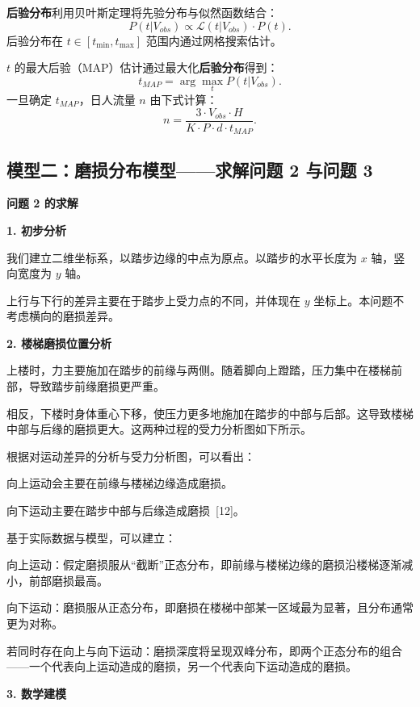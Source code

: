 \documentclass[11pt,a4paper]{ctexart}
\newcommand{\runin}[1]{\par\noindent\textbf{#1}\par\nobreak}
\begin{document}
\textbf{后验分布}利用贝叶斯定理将先验分布与似然函数结合：
\begin{equation}
P(t|V_{obs})\propto\mathcal{L}(t|V_{obs})\cdot P(t). \tag{11}
\end{equation}
后验分布在 $t\in[t_{\min},t_{\max}]$ 范围内通过网格搜索估计。

$t$ 的最大后验（MAP）估计通过最大化\textbf{后验分布}得到：
\begin{equation}
t_{MAP}=\arg\max_{t}P(t|V_{obs}). \tag{12}
\end{equation}
一旦确定 $t_{MAP}$，日人流量 $n$ 由下式计算：
\begin{equation}
n=\frac{3\cdot V_{obs}\cdot H}{K\cdot P\cdot d\cdot t_{MAP}}. \tag{13}
\end{equation}

\subsection{模型二：磨损分布模型——求解问题 2 与问题 3}

\runin{问题 2 的求解}

\runin{1. 初步分析}

我们建立二维坐标系，以踏步边缘的中点为原点。以踏步的水平长度为 $x$ 轴，竖向宽度为 $y$ 轴。

上行与下行的差异主要在于踏步上受力点的不同，并体现在 $y$ 坐标上。本问题不考虑横向的磨损差异。

\runin{2. 楼梯磨损位置分析}

上楼时，力主要施加在踏步的前缘与两侧。随着脚向上蹬踏，压力集中在楼梯前部，导致踏步前缘磨损更严重。

相反，下楼时身体重心下移，使压力更多地施加在踏步的中部与后部。这导致楼梯中部与后缘的磨损更大。这两种过程的受力分析图如下所示。

根据对运动差异的分析与受力分析图，可以看出：

向上运动会主要在前缘与楼梯边缘造成磨损。

向下运动主要在踏步中部与后缘造成磨损\ [12]。

基于实际数据与模型，可以建立：

向上运动：假定磨损服从“截断”正态分布，即前缘与楼梯边缘的磨损沿楼梯逐渐减小，前部磨损最高。

向下运动：磨损服从正态分布，即磨损在楼梯中部某一区域最为显著，且分布通常更为对称。

若同时存在向上与向下运动：磨损深度将呈现双峰分布，即两个正态分布的组合——一个代表向上运动造成的磨损，另一个代表向下运动造成的磨损。

\runin{3. 数学建模}
\end{document}
